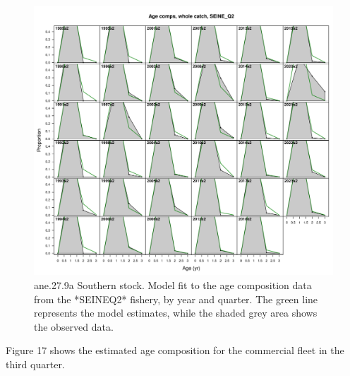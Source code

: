 \documentclass[
]{article}
\begin{document}
\begin{figure}[H]

{\centering \includegraphics[width=0.95\linewidth]{report/run/S1.0_4FLEETS_SelECO_RecIndex_Mnewfix/fig_age_fit_SeineQ2} 

}

\caption{ane.27.9a Southern stock. Model fit to the age composition data from the *SEINEQ2* fishery, by year and quarter. The green line represents the model estimates, while the shaded grey area shows the observed data.}\label{fig:unnamed-chunk-20}
\end{figure}

Figure 17 shows the estimated age composition for the commercial fleet
in the third quarter.
\end{document}
